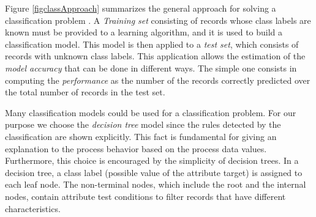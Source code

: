 \documentclass{llncs}
\begin{document}
Figure \ref{figclassApproach} summarizes the general approach for solving a classification problem \cite{5}. A \emph{Training set} consisting of records whose class labels are known must be provided to a learning algorithm, and it is used to build a classification model. This model is then applied to a \emph{test set}, which consists of records with unknown class labels. This application allows the estimation of the \emph{model accuracy} that can be done in different ways. The simple one consists in computing the \emph{performance} as the number of the records correctly predicted over the total number of records in the test set.

Many classification models could be used for a classification problem. For our purpose we choose the \emph{decision tree} model since the rules detected by the classification are shown explicitly. This fact is fundamental for giving an explanation to the process behavior based on the process data values. Furthermore, this choice is encouraged by the simplicity of decision trees. In a decision tree, a class label (possible value of the attribute target) is assigned to each leaf node. The non-terminal nodes, which include the root and the internal nodes, contain attribute test conditions to filter records that have different characteristics.

\end{document}
